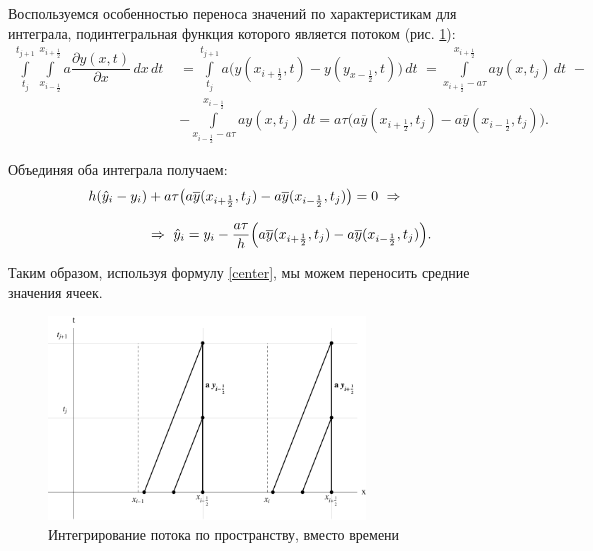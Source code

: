 \documentclass[12pt,a4paper]{article}
\newcommand{\picref}[1]{рис. \ref{#1}}
\newcommand{\half}{\frac{1}{2}}
\begin{document}
    Воспользуемся особенностью переноса значений по характеристикам для интеграла, подинтегральная функция которого является потоком (\picref{fig:flow_visual}):
    \[
        \begin{split}
            \int \limits_{t_j}^{t_{j+1}} \int \limits_{x_{i-\half}}^{x_{i+\half}} a \dfrac{ \partial y(x,t) }{ \partial x } \, dx \, dt \,\, &= \int \limits_{t_j}^{t_{j+1}} a \bigl( y(x_{i+\half}, t) - y(y_{x-\half}, t) \bigr) \, dt \,\, =  \int \limits_{x_{i+\half}-a\tau}^{x_{i+\half}} a y(x, t_j) \, dt \,\, - \\
            &- \int \limits_{x_{i-\half}-a\tau}^{x_{i-\half}} a y(x, t_j) \, dt = a\tau\bigl( a \overline y(x_{i+\half}, t_j) - a \overline y(x_{i-\half}, t_j) \bigr).
        \end{split}
    \]

    Объединяя оба интеграла получаем:
    \begin{equation}
        \begin{split}
            h ( \hat y_i - y_i) &+ a\tau\bigl( a \overline y(x_{i+\half}, t_j) - a \overline y(x_{i-\half}, t_j) \bigr) = 0 \,\, \Rightarrow \\[0.7em]
            &\Rightarrow \,\, \hat y_i = y_i - \dfrac{ a\tau }{ h } \Bigl( a \overline y(x_{i+\half}, t_j) - a \overline y(x_{i-\half}, t_j) \Bigr).
        \end{split}
        \label{center}
    \end{equation}

    Таким образом, используя формулу \eqref{center}, мы можем переносить средние значения ячеек.

    \pagebreak

    \begin{figure}[h]
        \centering
        \includegraphics[width=0.75\textwidth]{flow_visual.pdf}
        \caption{Интегрирование потока по пространству, вместо времени}
        \label{fig:flow_visual}
    \end{figure}
\end{document}
